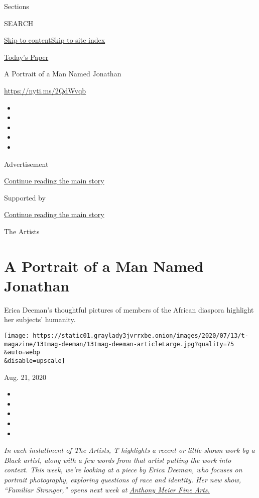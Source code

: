 Sections

SEARCH

\protect\hyperlink{site-content}{Skip to
content}\protect\hyperlink{site-index}{Skip to site index}

\href{https://myaccount.nytimes3xbfgragh.onion/auth/login?response_type=cookie\&client_id=vi}{}

\href{https://www.nytimes3xbfgragh.onion/section/todayspaper}{Today's
Paper}

A Portrait of a Man Named Jonathan

\url{https://nyti.ms/2QdWvqb}

\begin{itemize}
\item
\item
\item
\item
\item
\end{itemize}

Advertisement

\protect\hyperlink{after-top}{Continue reading the main story}

Supported by

\protect\hyperlink{after-sponsor}{Continue reading the main story}

The Artists

\hypertarget{a-portrait-of-a-man-named-jonathan}{%
\section{A Portrait of a Man Named
Jonathan}\label{a-portrait-of-a-man-named-jonathan}}

Erica Deeman's thoughtful pictures of members of the African diaspora
highlight her subjects' humanity.

\texttt{[image: https://static01.graylady3jvrrxbe.onion/images/2020/07/13/t-magazine/13tmag-deeman/13tmag-deeman-articleLarge.jpg?quality=75\\\&auto=webp\\\&disable=upscale]}

Aug. 21, 2020

\begin{itemize}
\item
\item
\item
\item
\item
\end{itemize}

\emph{In each installment of The Artists, T highlights a recent or
little-shown work by a Black artist, along with a few words from that
artist putting the work into context. This week, we're looking at a
piece by Erica Deeman, who focuses on portrait photography, exploring
questions of race and identity. Her new show, ``Familiar Stranger,''
opens next week at}
\href{http://www.anthonymeierfinearts.com/exhibitions}{\emph{Anthony
Meier Fine Arts.}}

